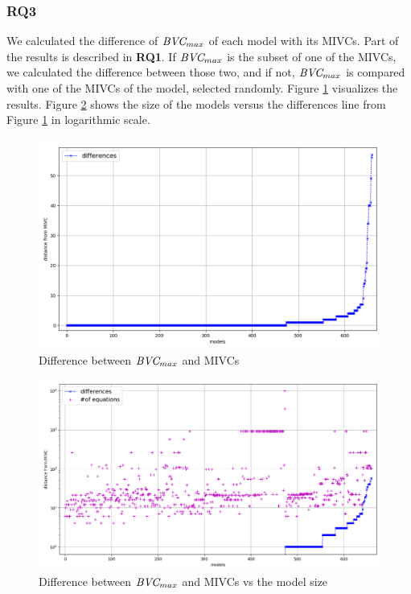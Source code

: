 \vspace{0.1in}
\subsubsection{RQ3}
We calculated the difference of $\textit{BVC} _{max}$ of each model with its MIVCs. Part of the results is described in \textbf{RQ1}. If $\textit{BVC} _{max}$  is the subset of one of the MIVCs, we calculated the difference between those two, and if not, $\textit{BVC} _{max}$  is compared with one of the MIVCs of the model, selected randomly.  Figure \ref{fig:dif-bvc} visualizes the results. Figure \ref{fig:bvc-size} shows the size of the models versus the differences line from Figure \ref{fig:dif-bvc} in logarithmic scale.

 \begin{figure}
 \centering
  \includegraphics[width=\columnwidth]{figs/bvc_dif_yices.png}
  \caption{Difference between $\textit{BVC} _{max}$ and MIVCs}
  \vspace{0.1in}
  \label{fig:dif-bvc}
\end{figure}
 
 \begin{figure}
 \centering
  \includegraphics[width=\columnwidth]{figs/bvc_modelsize_yices.png}
  \caption{Difference between $\textit{BVC} _{max}$ and MIVCs vs the model size}
  \vspace{0.1in}
  \label{fig:bvc-size}
\end{figure} 